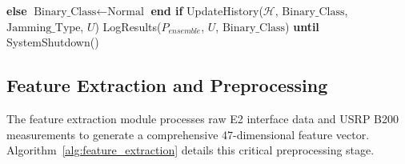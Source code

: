 \documentclass[journal]{IEEEtran}
\begin{document}
\begin{algorithm}[t]
\begin{algorithmic}[1]
\State \hspace{\algorithmicindent} \textbf{else}
\State \hspace{\algorithmicindent} \hspace{\algorithmicindent} $\text{Binary\_Class} \leftarrow \text{Normal}$
\State \hspace{\algorithmicindent} \textbf{end if}
\State \hspace{\algorithmicindent} 
\State \hspace{\algorithmicindent} UpdateHistory($\mathcal{H}$, $\text{Binary\_Class}$, $\text{Jamming\_Type}$, $U$)
\State \hspace{\algorithmicindent} LogResults($P_{ensemble}$, $U$, $\text{Binary\_Class}$)
\State \textbf{until} SystemShutdown()
\end{algorithmic}
\end{algorithm}

\subsection{Feature Extraction and Preprocessing}

The feature extraction module processes raw E2 interface data and USRP B200 measurements to generate a comprehensive 47-dimensional feature vector. Algorithm~\ref{alg:feature_extraction} details this critical preprocessing stage.
\end{document}
